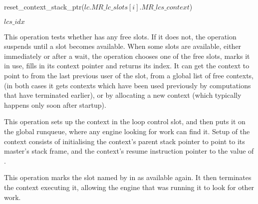 \begin{description}
\begin{algorithm}[tbp]
\begin{algorithmic}
    \State reset\_context\_stack\_ptr($lc.MR\_lc\_slots[i].MR\_lcs\_context$)

    \State \Return $lcs\_idx$
\EndProcedure
\end{algorithmic}
\caption{\lcwaitfreeslot}
\label{alg:lc_free_slot}
\end{algorithm}

\item[\code{LCslot = lc\_wait\_free\_slot(LC)}]
This operation tests whether \LC{} has any free slots.
If it does not, the operation suspends until a slot becomes available.
When some slots are available, either immediately or after a wait,
the operation chooses one of the free slots, marks it in use,
fills in its context pointer and returns its index.
It can get the context to point to
from the last previous user of the slot,
from a global list of free contexts,
(in both cases it gets contexts which have been used previously
by computations that have terminated earlier),
or by allocating a new context
(which typically happens only soon after startup).

\item[\code{lc\_spawn\_off(LC, LCslot, CodeLabel)}]
This operation sets up the context in the loop control slot,
and then puts it on the global runqueue,
where any engine looking for work can find it.
Setup of the context consists of initialising the context's parent stack
pointer to point to its master's stack frame,
and the context's resume instruction pointer to the value of .

\item[\code{lc\_join\_and\_terminate(LC, LCslot)}]
This operation marks the slot named by \LCS{} in \LC{} as available again.
It then terminates the context executing it,
allowing the engine that was running it to look for other work.


\end{description}
